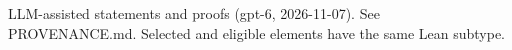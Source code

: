 \documentclass[11pt]{article}
\begin{document}

\bigskip
{\footnotesize LLM-assisted statements and proofs (gpt-6, 2026-11-07).
See PROVENANCE.md. Selected and eligible elements have the same Lean subtype.}
\end{document}
